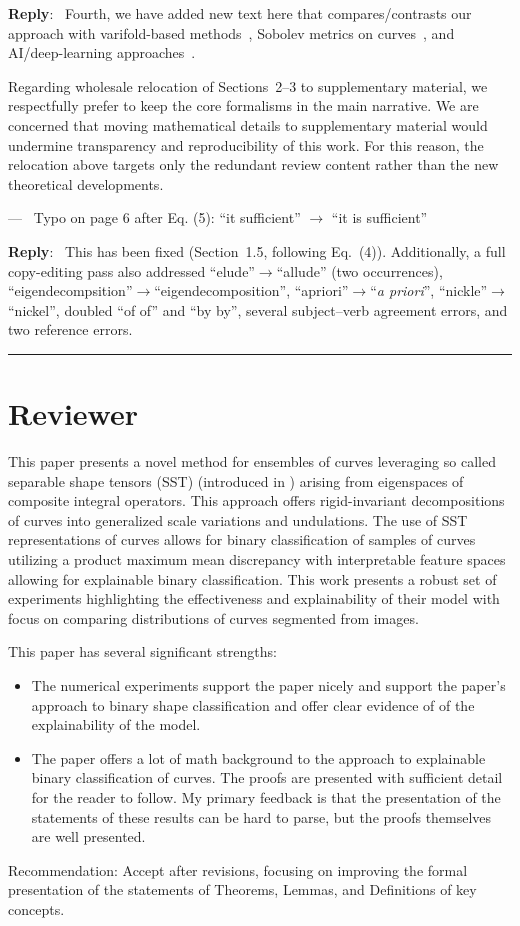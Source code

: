 \documentclass[11pt]{article}
\newcounter{reviewer}
\newcounter{point}[reviewer]
\renewcommand{\thepoint}{Comment\,\thereviewer.\arabic{point}}
\newcommand{\reviewersection}{\stepcounter{reviewer} \bigskip \hrule
                  \section*{Reviewer \thereviewer}}
\newenvironment{point}
   {\refstepcounter{point} \bigskip \noindent {\textbf{Reviewer~\thepoint} } ---\ }
   {\par }
\newenvironment{reply}
   {\medskip \noindent \color{blue} \begin{sf}\textbf{Reply}:\  }
   {\medskip \par \end{sf}}
\begin{document}
\begin{reply}
Fourth, we have added new text here that compares/contrasts our approach with varifold-based methods~\cite{kaltenmark2017, pierson2022}, Sobolev metrics on curves~\cite{bauer2017}, and AI/deep-learning approaches~\cite{hartman2023, hartman2021}.

Regarding wholesale relocation of Sections~2--3 to supplementary material, we respectfully prefer to keep the core formalisms in the main narrative. We are concerned that moving mathematical details to supplementary material would undermine transparency and reproducibility of this work. For this reason, the relocation above targets only the redundant review content rather than the new theoretical developments.
\end{reply}

\begin{point}
Typo on page 6 after Eq. (5): ``it sufficient'' $\rightarrow$ ``it is sufficient''
\end{point}
\begin{reply}
This has been fixed (Section~1.5, following Eq.~(4)). Additionally, a full copy-editing pass also addressed ``elude''$\to$``allude'' (two occurrences), ``eigendecompsition''$\to$``eigendecomposition'', ``apriori''$\to$``\emph{a priori}'', ``nickle''$\to$``nickel'', doubled ``of of'' and ``by by'', several subject--verb agreement errors, and two reference errors. %
\end{reply}


\reviewersection
This paper presents a novel method for ensembles of curves leveraging so called separable shape tensors (SST) (introduced in \cite{grey2023sst}) arising from eigenspaces of composite integral operators. This approach offers rigid-invariant decompositions of curves into generalized scale variations and undulations. The use of SST representations of curves allows for binary classification of samples of curves utilizing a product maximum mean discrepancy with interpretable feature spaces allowing for explainable binary classification. This work presents a robust set of experiments highlighting the effectiveness and explainability of their model with focus on comparing distributions of curves
segmented from images. 

This paper has several significant strengths:
\begin{itemize}
    \item The numerical experiments support the paper nicely and support the paper’s approach to binary shape classification and offer clear evidence of of the explainability of the model.
    \item The paper offers a lot of math background to the approach to explainable binary classification of curves. The proofs are presented with sufficient detail for the reader to follow. My primary feedback is that the presentation of the statements of these results can be hard to parse, but the proofs themselves are well presented.
\end{itemize}
Recommendation: Accept after revisions, focusing on improving the formal presentation of the statements of Theorems, Lemmas, and Definitions of key concepts.
\end{document}
